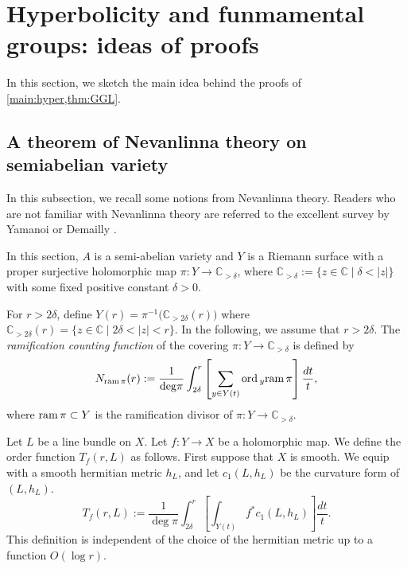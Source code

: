 \documentclass[english]{amsproc}
\theoremstyle{plain}
\theoremstyle{definition}
\theoremstyle{remark}
\theoremstyle{plain}
\numberwithin{equation}{thm} %
\newcommand{\bC}{\mathbb{C}}
\newcommand{\ord}{{\rm ord}\,}
\newcommand{\ram}{{\rm ram}\,}
\begin{document}
	
	
		\section{Hyperbolicity and funmamental groups: ideas of proofs}\label{sec:hyperbolicity}
	In this section, we sketch the main idea behind the proofs of   \cref{main:hyper,thm:GGL}.   
	\subsection{A theorem of Nevanlinna theory on  semiabelian variety}\label{sec:second}
	In this subsection, we recall some notions from Nevanlinna theory. Readers who are not familiar with Nevanlinna theory are referred to the excellent survey by Yamanoi \cite{Yam15b} or Demailly \cite{Dem97}.
	
	
	In this section, $A$ is a semi-abelian variety and $Y$ is a Riemann surface with a proper surjective holomorphic map $\pi:Y\to\mathbb C_{>\delta}$, where $\mathbb C_{>\delta}:=\{z\in\bC\mid \delta<|z|\}$ with some fixed positive constant $\delta>0$.
	
	For $r>2\delta$, define
	$
	Y(r)=\pi^{-1}\big( \mathbb C_{>2\delta}(r) \big)
	$ 
	where $\mathbb C_{>2\delta}(r)=\{z\in \bC\mid  2\delta<|z|<r\}$. 
	In the following, we assume that $r>2\delta$.
	The \emph{ramification counting function} of the covering $\pi:Y\to  \bC_{>\delta}$ is defined by
	$$
	N_{{\rm ram}\,  \pi}(r):=\frac{1}{{\rm deg} \pi}\int_{2\delta}^{r}\left[\sum_{y\in {Y}(t)} \ord_y \ram \pi \right]\frac{dt}{t},
	$$ 
	where $\ram \pi\subset Y$ is the ramification divisor of $\pi:Y\to\mathbb C_{>\delta}$.
	
	
	Let $L$ be a line bundle on $X$.
	Let $f:Y\to X$ be a holomorphic map.
	We define the order function $T_f(r,L)$ as follows.
	First suppose that $X$ is smooth.
	We equip with a smooth hermitian metric $h_L$, and let $c_1(L,h_L)$ be the curvature form of $(L, h_L)$.  
	$$
	T_f(r,L):=\frac{1}{\operatorname{deg} \pi} \int_{2\delta}^{r}\left[\int_{Y(t)} f^{*}c_1(L,h_L)\right] \frac{d t}{t}.
	$$
	This definition is independent of the choice of  the hermitian metric up to a function  $O(\log r)$.  
	
\end{document}

